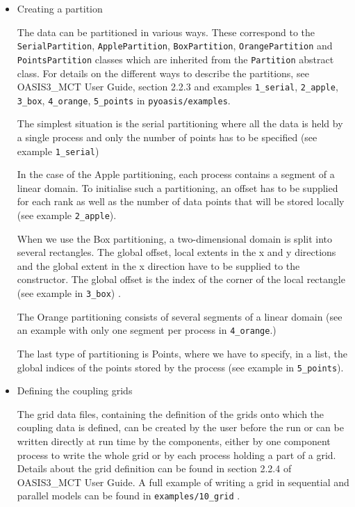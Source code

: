 \begin{itemize}
Also, the current OASIS3-MCT internal debug level ({\tt \$NLOGPRT}
value in the {\it namcouple}), can be retrieved as a property of a component,
namely {\tt debug\_level}, and can be changed by directly modifying this property,
as in {\tt pyoasis/examples/7-multiple-puts/python}. 

\item{Creating a partition}
\label{{index:creating-a-partition}}

The data can be partitioned in various ways.
These correspond to the  {\tt SerialPartition}, {\tt ApplePartition},
{\tt BoxPartition}, {\tt OrangePartition} and {\tt PointsPartition}
classes which are inherited from the {\tt Partition} abstract class.
For details on the different ways to describe the partitions,
see OASIS3\_MCT User Guide, section 2.2.3 and examples {\tt 1\_serial},
{\tt 2\_apple}, {\tt 3\_box}, {\tt 4\_orange}, {\tt 5\_points} in {\tt pyoasis/examples}.

The simplest situation is the serial partitioning where all the data is
held by a single process and only the number of points has to be
specified (see example {\tt 1\_serial})

In the case of the Apple partitioning, each process contains a segment
of a linear domain. To initialise such a partitioning, an offset has to
be supplied for each rank as well as the number of data points that
will be stored locally (see example  {\tt 2\_apple}).

When we use the Box partitioning, a two-dimensional domain is split
into several rectangles. The global offset, local extents in the x and
y directions and the global extent in the x direction have to be supplied
to the constructor. The global offset is the index of the corner of the local
rectangle (see example in {\tt 3\_box}) .

The Orange partitioning consists of several segments of a linear domain (see an example with only one segment per process in  {\tt 4\_orange}.)

The last type of partitioning is Points, where we have to
specify, in a list, the global indices of the points stored by the
process (see example in {\tt 5\_points}).

\item{Defining the coupling grids}
\label{index:defining-the-coupling-grids}

The grid data files, containing the definition of the grids onto which
the coupling data is defined, can be created by the user before the
run or can be written directly at run time by the components, either
by one component process to write the whole grid or by each process
holding a part of a grid. Details
about the grid definition can be found in section 2.2.4 of OASIS3\_MCT
User Guide. A full example of writing a grid in sequential and
parallel models can be found in {\tt examples/10\_grid} .


\end{itemize}
